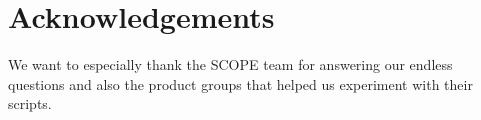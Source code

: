 \documentclass[sigconf]{acmart}
\begin{document}
%
%





\maketitle











\section*{Acknowledgements}
We want to especially thank the SCOPE team for answering our endless questions and also the product groups that helped us experiment with their scripts.


 
\end{document}
